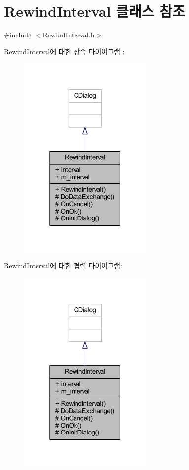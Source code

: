 \hypertarget{class_rewind_interval}{}\section{Rewind\+Interval 클래스 참조}
\label{class_rewind_interval}


{\ttfamily \#include $<$Rewind\+Interval.\+h$>$}



Rewind\+Interval에 대한 상속 다이어그램 \+: \nopagebreak
\begin{figure}[H]
\begin{center}
\leavevmode
\includegraphics[width=187pt]{class_rewind_interval__inherit__graph}
\end{center}
\end{figure}


Rewind\+Interval에 대한 협력 다이어그램\+:\nopagebreak
\begin{figure}[H]
\begin{center}
\leavevmode
\includegraphics[width=187pt]{class_rewind_interval__coll__graph}
\end{center}
\end{figure}
